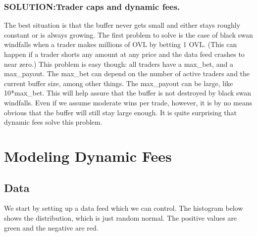 \documentclass[11pt]{article}
\begin{document}
    \subsubsection{\texorpdfstring{SOLUTION:Trader caps and dynamic
fees.}{SOLUTION: Trader caps and dynamic fees.}}\label{solution-trader-caps-and-dynamic-fees.}

The best situation is that the buffer never gets small and either stays
roughly constant or is always growing. The first problem to solve is the
case of black swan windfalls when a trader makes millions of OVL by
betting 1 OVL. (This can happen if a trader shorts any amount at any
price and the data feed crashes to near zero.) This problem is easy
though: all traders have a max\_bet, and a max\_payout. The max\_bet can
depend on the number of active traders and the current buffer size,
among other things. The max\_payout can be large, like 10*max\_bet. This
will help assure that the buffer is not destroyed by black swan
windfalls. Even if we assume moderate wins per trade, however, it is by
no means obvious that the buffer will still stay large enough. It is
quite surprising that dynamic fees solve this problem.

    \section{Modeling Dynamic Fees}\label{modeling-dynamic-fees}

    \subsection{Data}\label{data}

    We start by setting up a data feed which we can control. The histogram
below shows the distribution, which is just random normal. The positive
values are green and the negative are red.
\end{document}
